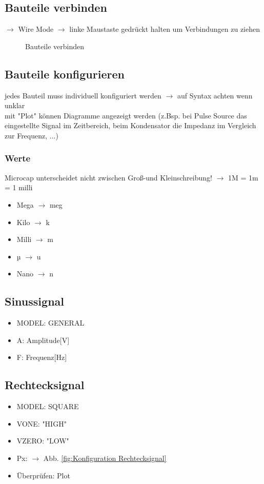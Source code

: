 \subsection{Bauteile verbinden}
$\rightarrow$ Wire Mode $\rightarrow$ linke Maustaste gedrückt halten um Verbindungen zu ziehen
\begin{figure}[h]
    \centering
    \caption{Bauteile verbinden}
    \label{fig:Bauteile verbinden}
\end{figure}

\subsection{Bauteile konfigurieren}
jedes Bauteil muss individuell konfiguriert werden $\rightarrow$ auf Syntax achten wenn unklar\\
mit "Plot" können Diagramme angezeigt werden (z.Bsp. bei Pulse Source das eingestellte Signal im Zeitbereich, beim Kondensator die Impedanz im Vergleich zur Frequenz, ...)

\subsubsection*{Werte}
Microcap unterscheidet nicht zwischen Groß-und Kleinschreibung!
$\rightarrow$ 1M = 1m = 1 milli
\begin{itemize}
    \item Mega $\rightarrow$ meg
    \item Kilo $\rightarrow$ k
    \item Milli $\rightarrow$ m
    \item µ $\rightarrow$ u
    \item Nano $\rightarrow$ n
\end{itemize}

\subsection*{Sinussignal}
\begin{itemize}
    \item MODEL: GENERAL
    \item A: Amplitude[V]
    \item F: Frequenz[Hz]
\end{itemize}

\subsection*{Rechtecksignal}
\begin{itemize}
    \item MODEL: SQUARE
    \item VONE: "HIGH"
    \item VZERO: "LOW"
    \item Px: $\rightarrow$ Abb. \ref{fig:Konfiguration Rechtecksignal}
    \item Überprüfen: Plot
\end{itemize}

